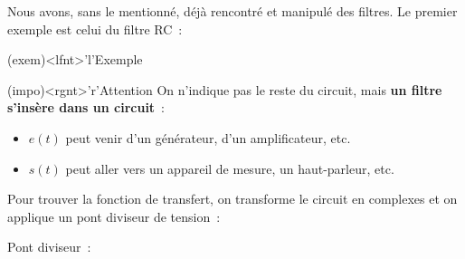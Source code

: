 \documentclass[../../main/main.tex]{subfiles}
\begin{document}
Nous avons, sans le mentionné, déjà rencontré et manipulé des filtres. Le premier
exemple est celui du filtre RC~:
\begin{tcbraster}[raster columns=2, raster equal height=rows]
	\begin{tcb}(exem)<lfnt>'l'{Exemple}
		\begin{minipage}{\linewidth}
			\vspace{-15pt}
		\end{minipage}
	\end{tcb}
	\begin{tcb}(impo)<rgnt>'r'{Attention}
		On n'indique pas le reste du circuit, mais \textbf{un filtre s'insère
			dans un circuit}~:
		\begin{itemize}
			\item $e(t)$ peut venir d'un générateur, d'un amplificateur, etc.
			\item $s(t)$ peut aller vers un appareil de mesure, un haut-parleur,
			      etc.
		\end{itemize}
	\end{tcb}
\end{tcbraster}

Pour trouver la fonction de transfert, on transforme le circuit en complexes et
on applique un pont diviseur de tension~:
\smallbreak
\noindent
\begin{minipage}[c]{.45\linewidth}
	\begin{center}
		\vspace{-15pt}
	\end{center}
\end{minipage}
\hfill
\begin{minipage}[c]{.5\linewidth}
	Pont diviseur~:
\end{minipage}
\end{document}
